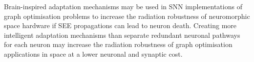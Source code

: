 Brain-inspired adaptation mechanisms may be used in SNN implementations of graph optimisation problems to increase the radiation robustness of neuromorphic space hardware if SEE propagations can lead to neuron death. Creating more intelligent adaptation mechanisms than separate redundant neuronal pathways for each neuron may increase the radiation robustness of graph optimisation applications  in space at a lower neuronal and synaptic cost.



